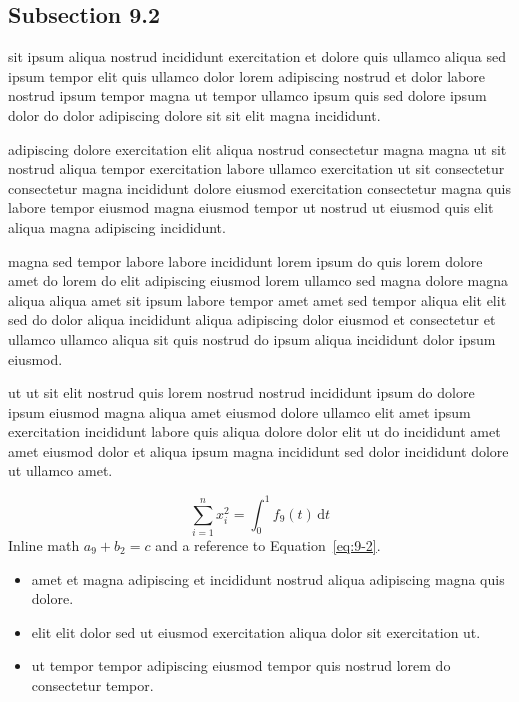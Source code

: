 \documentclass{article}
\begin{document}
\subsection{Subsection 9.2}\label{sec:9-2}
sit ipsum aliqua nostrud incididunt exercitation et dolore quis ullamco aliqua sed ipsum tempor elit quis ullamco dolor lorem adipiscing nostrud et dolor labore nostrud ipsum tempor magna ut tempor ullamco ipsum quis sed dolore ipsum dolor do dolor adipiscing dolore sit sit elit magna incididunt.

adipiscing dolore exercitation elit aliqua nostrud consectetur magna magna ut sit nostrud aliqua tempor exercitation labore ullamco exercitation ut sit consectetur consectetur magna incididunt dolore eiusmod exercitation consectetur magna quis labore tempor eiusmod magna eiusmod tempor ut nostrud ut eiusmod quis elit aliqua magna adipiscing incididunt.

magna sed tempor labore labore incididunt lorem ipsum do quis lorem dolore amet do lorem do elit adipiscing eiusmod lorem ullamco sed magna dolore magna aliqua aliqua amet sit ipsum labore tempor amet amet sed tempor aliqua elit elit sed do dolor aliqua incididunt aliqua adipiscing dolor eiusmod et consectetur et ullamco ullamco aliqua sit quis nostrud do ipsum aliqua incididunt dolor ipsum eiusmod.

ut ut sit elit nostrud quis lorem nostrud nostrud incididunt ipsum do dolore ipsum eiusmod magna aliqua amet eiusmod dolore ullamco elit amet ipsum exercitation incididunt labore quis aliqua dolore dolor elit ut do incididunt amet amet eiusmod dolor et aliqua ipsum magna incididunt sed dolor incididunt dolore ut ullamco amet.

\begin{equation}\label{eq:9-2}
  \sum_{i=1}^{n} x_i^{2} = \int_0^1 f_{9}(t)\,\mathrm{d}t
\end{equation}
Inline math $a_{9} + b_{2} = c$ and a reference to Equation~\eqref{eq:9-2}.

\begin{itemize}
  \item amet et magna adipiscing et incididunt nostrud aliqua adipiscing magna quis dolore.
  \item elit elit dolor sed ut eiusmod exercitation aliqua dolor sit exercitation ut.
  \item ut tempor tempor adipiscing eiusmod tempor quis nostrud lorem do consectetur tempor.
\end{itemize}
\end{document}
